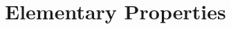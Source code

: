 \begingroup
    \ifcsname\PATH\endcsname
        \newcommand{\PATH}{books/Algebra/Modules}
        \newcommand{\OLDPATH}{\PATH}
    \else
        \newcommand{\OLDPATH}{\PATH}
        \renewcommand{\PATH}{books/Algebra/Modules}
    \fi
    \chapter{Elementary Properties}
        

    \renewcommand{\PATH}{\OLDPATH}
\endgroup